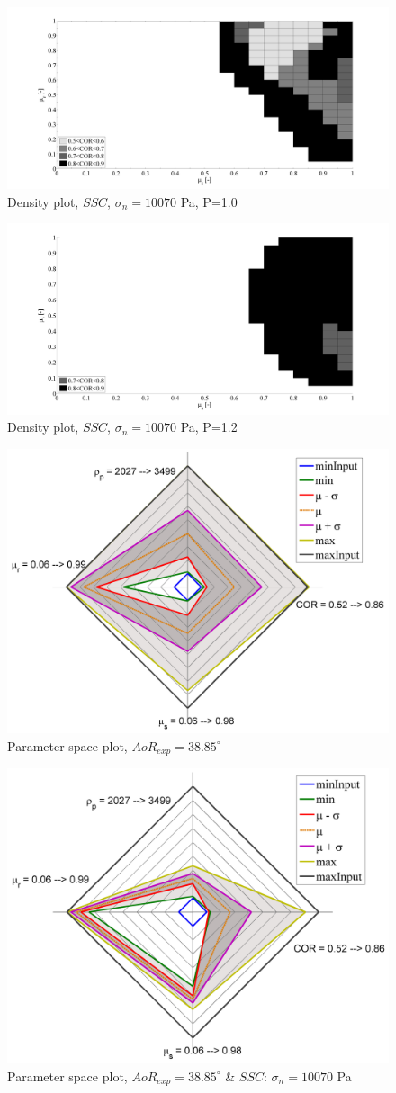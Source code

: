 \begin{figure}%
\centering 
\includegraphics[width=.48\columnwidth]{images/25cloudpirker1schulze10070} 
\caption{Density plot, $SSC$, $\sigma_n=10070$ Pa, P=1.0}
\label{fig:25cloudpirker1schulze10070} 
\end{figure}
\begin{figure}%
\centering 
\includegraphics[width=.48\columnwidth]{images/30cloudpirker12schulze10070} 
\caption{Density plot, $SSC$, $\sigma_n=10070$ Pa, P=1.2}
\label{fig:30cloudpirker12schulze10070} 
\end{figure}

\begin{figure}%
\centering 
\includegraphics[width=.48\columnwidth]{images/31radarpirker1aor} 
\caption{Parameter space plot, $AoR_{exp} = 38.85 ^\circ$}
\label{fig:31radarpirker1aor} 
\end{figure}
\begin{figure}%
\centering 
\includegraphics[width=.48\columnwidth]{images/33radarpirker1schulze10070aor} 
\caption{Parameter space plot, $AoR_{exp} = 38.85
        ^\circ$ \& $SSC$: $\sigma_n=10070$ Pa}
\label{fig:33radarpirker1schulze10070aor} 
\end{figure}
